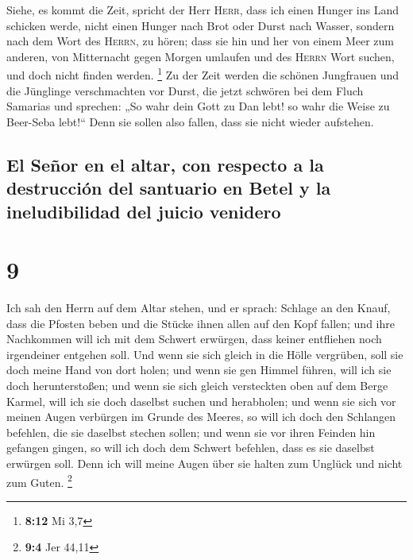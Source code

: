  Siehe, es kommt die Zeit, spricht der Herr
\textsc{Herr}, dass ich einen Hunger ins Land schicken werde, nicht
einen Hunger nach Brot oder Durst nach Wasser, sondern nach dem Wort des
\textsc{Herrn}, zu hören;  dass sie hin und her von einem
Meer zum anderen, von Mitternacht gegen Morgen umlaufen und des
\textsc{Herrn} Wort suchen, und doch nicht finden werden. \footnote{\textbf{8:12}
  Mi 3,7}  Zu der Zeit werden die schönen Jungfrauen und
die Jünglinge verschmachten vor Durst,  die jetzt
schwören bei dem Fluch Samarias und sprechen: „So wahr dein Gott zu Dan
lebt! so wahr die Weise zu Beer-Seba lebt!{}`` Denn sie sollen also
fallen, dass sie nicht wieder aufstehen.

\hypertarget{el-seuxf1or-en-el-altar-con-respecto-a-la-destrucciuxf3n-del-santuario-en-betel-y-la-ineludibilidad-del-juicio-venidero}{%
\subsection{El Señor en el altar, con respecto a la destrucción del
santuario en Betel y la ineludibilidad del juicio
venidero}\label{el-seuxf1or-en-el-altar-con-respecto-a-la-destrucciuxf3n-del-santuario-en-betel-y-la-ineludibilidad-del-juicio-venidero}}

\hypertarget{section-8}{%
\section{9}\label{section-8}}

 Ich sah den Herrn auf dem Altar stehen, und er sprach:
Schlage an den Knauf, dass die Pfosten beben und die Stücke ihnen allen
auf den Kopf fallen; und ihre Nachkommen will ich mit dem Schwert
erwürgen, dass keiner entfliehen noch irgendeiner entgehen soll.
 Und wenn sie sich gleich in die Hölle vergrüben, soll sie
doch meine Hand von dort holen; und wenn sie gen Himmel führen, will ich
sie doch herunterstoßen;  und wenn sie sich gleich
versteckten oben auf dem Berge Karmel, will ich sie doch daselbst suchen
und herabholen; und wenn sie sich vor meinen Augen verbürgen im Grunde
des Meeres, so will ich doch den Schlangen befehlen, die sie daselbst
stechen sollen;  und wenn sie vor ihren Feinden hin
gefangen gingen, so will ich doch dem Schwert befehlen, dass es sie
daselbst erwürgen soll. Denn ich will meine Augen über sie halten zum
Unglück und nicht zum Guten. \footnote{\textbf{9:4} Jer 44,11}

